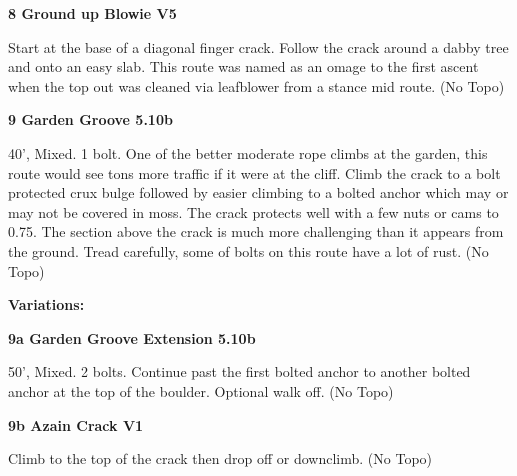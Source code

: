 \begin{multicols}{2}
\needspace{1.5cm}
\label{rt:Ground up Blowie}
\colorbox{RoyalBlue!20}{
\parbox{0.95\linewidth}{
\textbf{
8 Ground up Blowie V5  
}}}

\begin{adjustwidth}{0.5cm}{}			
Start at the base of a diagonal finger crack. Follow the crack around a dabby tree and onto an easy slab. This route was named as an omage to the first ascent when the top out was cleaned via leafblower from a stance mid route. (No Topo)
\end{adjustwidth}



\needspace{1.5cm}
\label{rt:Garden Groove}
\colorbox{RoyalBlue!20}{
\parbox{0.95\linewidth}{
\textbf{
9 Garden Groove 5.10b  
}}}

\begin{adjustwidth}{0.5cm}{}			
40', Mixed. 1 bolt. One of the better moderate rope climbs at the garden, this route would see tons more traffic if it were at the cliff. Climb the crack to a bolt protected crux bulge followed by easier climbing to a bolted anchor which may or may not be covered in moss. The crack protects well with a few nuts or cams to 0.75. The section above the crack is much more challenging than it appears from the ground. Tread carefully, some of bolts on this route have a lot of rust. (No Topo)
\end{adjustwidth}

\begin{adjustwidth}{0.5cm}{}				
\needspace{3cm}
\textbf{Variations:} \newline

\needspace{1.5cm}
\label{vr:Garden Groove Extension}
\colorbox{RoyalBlue!20}{
\parbox{0.95\linewidth}{
\textbf{
9a Garden Groove Extension 5.10b  
}}}

\begin{adjustwidth}{0.5cm}{}			
50', Mixed. 2 bolts. Continue past the first bolted anchor to another bolted anchor at the top of the boulder. Optional walk off. (No Topo)
\end{adjustwidth}



\needspace{1.5cm}
\label{vr:Azain Crack}
\colorbox{green!20}{
\parbox{0.95\linewidth}{
\textbf{
9b Azain Crack V1  
}}}

\begin{adjustwidth}{0.5cm}{}			
Climb to the top of the crack then drop off or downclimb. (No Topo)
\end{adjustwidth}



\end{adjustwidth}
\end{multicols}
